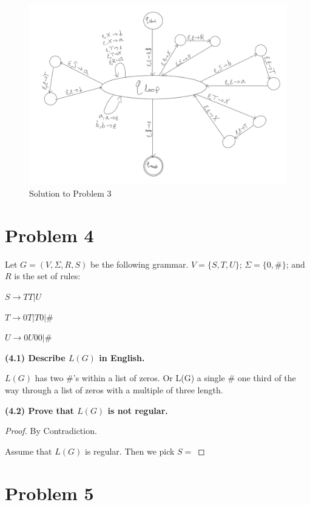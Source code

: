\documentclass[11pt]{article}
\begin{document}
\begin{figure}[h!]
\includegraphics[scale=1]{problem3.png} 
\caption{Solution to Problem 3}
\end{figure}



\newpage
\section*{Problem 4}

\noindent
Let $G=(V,\Sigma,R,S)$ be the following grammar. $V=\{S,T,U\}$;
$\Sigma=\{0,\#\}$; and $R$ is the set of rules:

$S\rightarrow TT|U$

$T\rightarrow 0T|T0|\#$

$U\rightarrow 0U00|\#$

\noindent
\textbf{(4.1) Describe $L(G)$ in English.}
\newline

$L(G)$ has two $\#$'s within a list of zeros. Or L(G) a single $\#$ one third of the way through a list of zeros with a multiple of three length.

\noindent
\textbf{(4.2) Prove that $L(G)$ is not regular.}

\begin{proof} By Contradiction.

Assume that $L(G)$ is regular. Then we pick $S= $

\end{proof}


\newpage
\section*{Problem 5}
\end{document}

